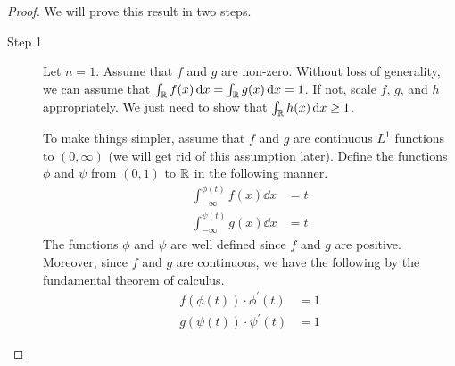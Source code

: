 \documentclass[11pt]{article}
\begin{document}
\begin{proof}
  We will prove this result in two steps.
  \begin{description}
  \item[Step 1] Let $n = 1$. Assume that $f$ and $g$ are non-zero. Without loss of generality, we can assume that $\int_{\mathbb{R}} f(x) \mathrm{\,d} x = \int_{\mathbb{R}} g(x) \mathrm{\,d} x = 1$. If not, scale $f$, $g$, and $h$ appropriately.
    We just need to show that $\int_{\mathbb{R}} h(x) \mathrm{\,d} x \geq 1$.

    To make things simpler, assume that $f$ and $g$ are continuous $L^1$ functions to $(0, \infty)$ (we will get rid of this assumption later).
    Define the functions $\phi$ and $\psi$ from $(0,1)$ to $\mathbb{R}$ in the following manner.
    \begin{align*}
      \int_{-\infty}^{\phi(t)} f(x) \dd x &= t \\
      \int_{-\infty}^{\psi(t)} g(x) \dd x &= t
    \end{align*}
    The functions $\phi$ and $\psi$ are well defined since $f$ and $g$ are positive.
    Moreover, since $f$ and $g$ are continuous, we have the following by the fundamental theorem of calculus.
    \begin{align*}
      f(\phi(t)) \cdot \phi^{\prime}(t) &= 1 \\
      g(\psi(t)) \cdot \psi^{\prime}(t) &= 1
    \end{align*}


\end{description}
\end{proof}
\end{document}
